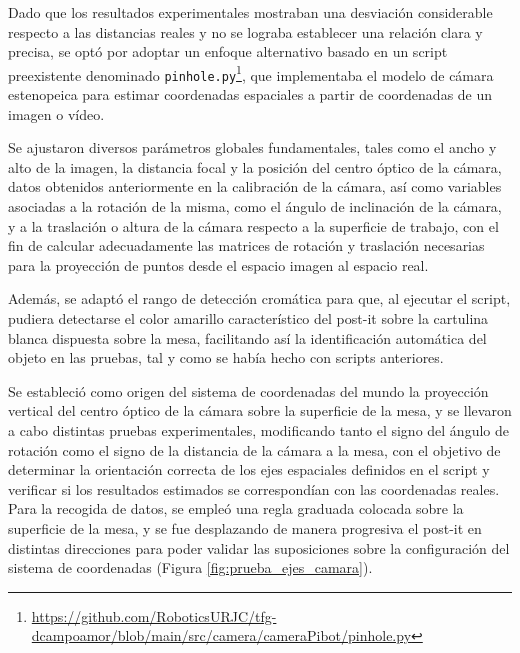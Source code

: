 Dado que los resultados experimentales mostraban una desviación considerable respecto a las distancias reales y no se lograba establecer una relación clara y precisa, se optó por adoptar un enfoque alternativo basado en un script preexistente denominado \verb|pinhole.py|\footnote{\url{https://github.com/RoboticsURJC/tfg-dcampoamor/blob/main/src/camera/cameraPibot/pinhole.py}}, que implementaba el modelo de cámara estenopeica para estimar coordenadas espaciales a partir de coordenadas de un imagen o vídeo. 

Se ajustaron diversos parámetros globales fundamentales, tales como el ancho y alto de la imagen, la distancia focal y la posición del centro óptico de la cámara, datos obtenidos anteriormente en la calibración de la cámara, así como variables asociadas a la rotación de la misma, como el ángulo de inclinación de la cámara, y a la traslación o altura de la cámara respecto a la superficie de trabajo, con el fin de calcular adecuadamente las matrices de rotación y traslación necesarias para la proyección de puntos desde el espacio imagen al espacio real. 

Además, se adaptó el rango de detección cromática para que, al ejecutar el script, pudiera detectarse el color amarillo característico del post-it sobre la cartulina blanca dispuesta sobre la mesa, facilitando así la identificación automática del objeto en las pruebas, tal y como se había hecho con scripts anteriores.

Se estableció como origen del sistema de coordenadas del mundo la proyección vertical del centro óptico de la cámara sobre la superficie de la mesa, y se llevaron a cabo distintas pruebas experimentales, modificando tanto el signo del ángulo de rotación como el signo de la distancia de la cámara a la mesa, con el objetivo de determinar la orientación correcta de los ejes espaciales definidos en el script y verificar si los resultados estimados se correspondían con las coordenadas reales. Para la recogida de datos, se empleó una regla graduada colocada sobre la superficie de la mesa, y se fue desplazando de manera progresiva el post-it en distintas direcciones para poder validar las suposiciones sobre la configuración del sistema de coordenadas (Figura \ref{fig:prueba_ejes_camara}).

